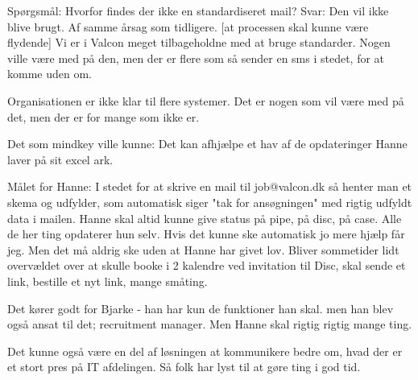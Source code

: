 \begin{linenumbers*}
Spørgsmål:
Hvorfor findes der ikke en standardiseret mail?
Svar:
 Den vil ikke blive brugt. Af samme årsag som tidligere.  [at processen skal kunne være flydende]
Vi er i Valcon meget tilbageholdne med at bruge standarder.
Nogen ville være med på den, men der er flere som så sender en sms i stedet, for at komme uden om.

Organisationen er ikke klar til flere systemer. Det er nogen som vil være med på det, men der er for mange som ikke er.


Det som mindkey ville kunne:
Det kan afhjælpe et hav af de opdateringer Hanne laver på sit excel ark. 


Målet for Hanne:
I stedet for at skrive en mail til job@valcon.dk så henter man et skema og udfylder, som automatisk siger "tak for ansøgningen" med rigtig udfyldt data i mailen.
Hanne skal altid kunne give status på pipe, på disc, på case. Alle de her ting opdaterer hun selv. Hvis det kunne ske automatisk jo mere hjælp får jeg.
Men det må aldrig ske uden at Hanne har givet lov.
Bliver sommetider lidt overvældet over at skulle booke i 2 kalendre ved invitation til Disc, skal sende et link, bestille et nyt link, mange småting. 

Det kører godt for Bjarke - han har kun de funktioner han skal. men han blev også ansat til det; recruitment manager. Men Hanne skal rigtig rigtig mange ting.

Det kunne også være en del af løsningen at kommunikere bedre om, hvad der er et stort pres på IT afdelingen. Så folk har lyst til at gøre ting i god tid.
\end{linenumbers*}